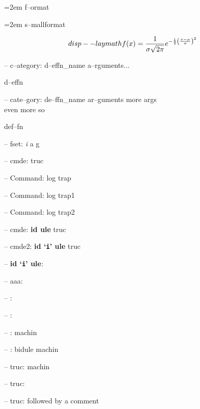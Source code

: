 \documentclass{book}
\begin{document}
\begin{titlepage}
\par\begingroup\obeylines\obeyspaces\frenchspacing\leftskip=2em\relax\parskip=0pt\relax{}%
f--ormat
\endgroup{}%

\par\begingroup\obeylines\obeyspaces\frenchspacing\leftskip=2em\relax\parskip=0pt\relax\footnotesize{}%
s--mallformat
\endgroup{}%

$$
disp--laymath
f(x) = {1 \over \sigma \sqrt{2\pi}}e^{-{1 \over 2}\left({x-\mu \over \sigma}\right)^2}
$$

\hbox{}-- c--ategory: d--effn\_name a--rguments...


%
d--effn

\hbox{}-- cate--gory: de--ffn\_name ar--guments    more args \leavevmode{}\\ even more so


%
def--fn

\hbox{}-- fset: \emph{i} a g


%
%
\hbox{}-- cmde: truc 


%
\hbox{}-- Command: log trap 


%
\hbox{}-- Command: log trap1 


%
\hbox{}-- Command: log trap2 


%
\hbox{}-- cmde: \textbf{id ule} truc


%
\hbox{}-- cmde2: \textbf{id `\texttt{i}' ule} truc


%
\hbox{}-- \textbf{id `\texttt{i}' ule}: 



\hbox{}-- aaa: 


\hbox{}-- : 


\hbox{}-- : 


\hbox{}-- : machin


%
\hbox{}-- : bidule machin


%
\hbox{}-- truc: machin


%
\hbox{}-- truc: 


\hbox{}-- truc: followed by a comment



\end{titlepage}
\end{document}
